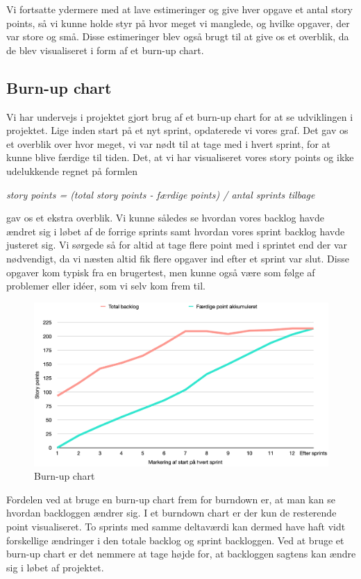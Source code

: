 Vi fortsatte ydermere med at lave estimeringer og give hver opgave et antal story points, så vi kunne holde styr på hvor meget vi manglede, og hvilke opgaver, der var store og små. Disse estimeringer blev også brugt til at give os et overblik, da de blev visualiseret i form af et burn-up chart.

\subsection{Burn-up chart}
Vi har undervejs i projektet gjort brug af et burn-up chart for at se udviklingen i projektet. Lige inden start på et nyt sprint, opdaterede vi vores graf. Det gav os et overblik over hvor meget, vi var nødt til at tage med i hvert sprint, for at kunne blive færdige til tiden. Det, at vi har visualiseret vores story points og ikke udelukkende regnet på formlen \medskip

\textit{story points = (total story points - færdige points) / antal sprints tilbage} \smallskip

gav os et ekstra overblik. Vi kunne således se hvordan vores backlog havde ændret sig i løbet af de forrige sprints samt hvordan vores sprint backlog havde justeret sig.  Vi sørgede så for altid at tage flere point med i sprintet end der var nødvendigt, da vi næsten altid fik flere opgaver ind efter et sprint var slut. Disse opgaver kom typisk fra en brugertest, men kunne også være som følge af problemer eller idéer, som vi selv kom frem til.

\begin{figure}[H]
    \centering
    \includegraphics[width=1\textwidth]{img/burn-up-chart.png}
    \caption{Burn-up chart}
\end{figure}

Fordelen ved at bruge en burn-up chart frem for burndown er, at man kan se hvordan backloggen ændrer sig. I et burndown chart er der kun de resterende point visualiseret. To sprints med samme deltaværdi kan dermed have haft vidt forskellige ændringer i den totale backlog og sprint backloggen. Ved at bruge et burn-up chart er det nemmere at tage højde for, at backloggen sagtens kan ændre sig i løbet af projektet.
